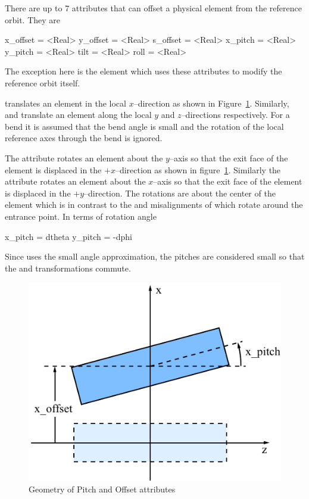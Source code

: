 There are up to 7 attributes that can offset a physical element
from the reference orbit. They are
\begin{example}
  x_offset = <Real>
  y_offset = <Real>
  s_offset = <Real>
  x_pitch  = <Real>
  y_pitch  = <Real>
  tilt     = <Real>
  roll     = <Real>
\end{example}
The exception here is the  element which uses these
attributes to modify the reference orbit itself.

 translates an element in the local $x$--direction
as shown in Figure~\ref{f:pitch}. Similarly,  and 
 translate an element along the local $y$ and 
$z$--directions respectively. For a bend it is assumed that
the bend angle is small and the rotation of the local reference
axes through the bend is ignored.

The  attribute rotates an element about the $y$--axis so
that the exit face of the element is displaced in the $+x$--direction
as shown in figure~\ref{f:pitch}. Similarly the  attribute
rotates an element about the $x$--axis so that the exit face of the
element is displaced in the $+y$--direction. The rotations are about
the center of the element which is in contrast to the  and
 misalignments of \mad which rotate around the entrance
point. In terms of rotation angle
\begin{example}
  x_pitch =  dtheta
  y_pitch = -dphi
\end{example}
Since \bmad uses the small angle approximation, the pitches are
considered small so that the  and 
transformations commute.

\begin{figure}[t]
  \centering
  \includegraphics{pitch.pdf}
  \caption{Geometry of Pitch and Offset attributes}
  \label{f:pitch}
\end{figure}

